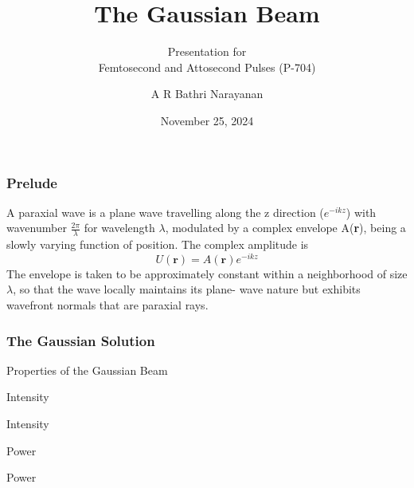 \documentclass[11pt]{beamer}
\begin{document}
	\author{A R Bathri Narayanan}
	\title{The Gaussian Beam}
	\subtitle{Presentation for\\Femtosecond and Attosecond Pulses (P-704)}
	\date{November 25, 2024}
	\subject{Femtosecond and Attosecond pulses}
	\begin{frame}[plain]
		\maketitle
	\end{frame}
	
	\begin{frame}
		\frametitle{Prelude}
		A paraxial wave is a plane wave travelling along the z direction ($e^{-ikz}$) with wavenumber $\frac{2\pi}{\lambda}$ for wavelength $\lambda$, modulated by a complex envelope A(\textbf{r}), being a slowly varying function of position.  The complex amplitude is 
		\[U(\textbf{r})=A(\textbf{r})e^{-ikz}\]
		The envelope is taken to be approximately constant within a
		neighborhood of size $\lambda$, so that the wave locally maintains its plane-
		wave nature but exhibits wavefront normals that are paraxial rays.
	\end{frame}
	
	\begin{frame}
		\frametitle{The Gaussian Solution}
	\end{frame}
	
	\begin{frame}{Properties of the Gaussian Beam}
		
	\end{frame}
	
	\begin{frame}{Intensity}
		
	\end{frame}
	
	\begin{frame}{Intensity}
		
	\end{frame}
	
	\begin{frame}{Power}
		
	\end{frame}
	
	\begin{frame}{Power}
		
	\end{frame}
	
\end{document}
